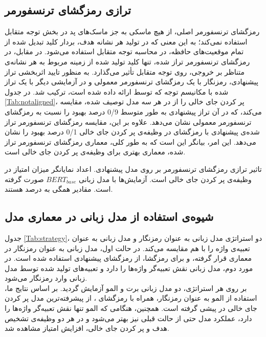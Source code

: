 \subsection{ترازی رمزگشای ترنسفورمر}
رمزگشای ترنسفورمر اصلی، از هیچ ماسکی به جز ماسک‌های پد در بخش توجه متقابل استفاده نمی‌کند؛ به این معنی که در تولید هر نشانه هدف، بردار کلید تبدیل شده از تمام موقعیت‌های حافظه، در محاسبه توجه متقابل استفاده می‌شود. در مقابل، در رمزگشای ترنسفورمر تراز شده، تنها کلید تولید شده از زمینه مربوط به هر نشانه‌ی متناظر بر خروجی، روی توجه متقابل تأثیر می‌گذارد. به منظور تایید اثربخشی تراز پیشنهادی، رمزنگار  با یک رمزگشای ترنسفورمر معمولی و در آزمایشی دیگر با یک  تراز شده با مکانیسم توجه که توسط \cite{Wang:18} ارائه داده شده است، ترکیب شد. در جدول \ref{Tab:notaligned}،  پر کردن جای خالی را از در هر سه مدل توصیف شده، مقایسه می‌کند، که در آن تراز پیشنهادی به طور متوسط 0‍/‍9 درصد بهبود را نسبت به رمزگشای ترنسفورمر معمولی نشان می‌دهد. علاوه بر این، مقایسه رمزگشای ترنسفورمر تراز شده‌ی پیشنهادی با رمزگشای \cite{Wang:18} در وظیفه‌ی پر کردن جای خالی 0‍/‍1 درصد بهبود را نشان می‌دهد. این امر، بیانگر این است که به طور کلی، معماری رمزگشای ترنسفورمر تراز شده، معماری بهتری برای وظیفه‌ی پر کردن جای خالی است.
\begin{table}[ht]
		
	\caption[تاثیر ترازی رمزگشای ترنسفورمر بر روی مدل پیشنهادی]{
		تاثیر ترازی رمزگشای ترنسفورمر بر روی مدل پیشنهادی. اعداد نمایانگر میزان امتیاز  در وظیفه‌ی پر کردن جای خالی است. آزمایش‌ها با مدل زبانی $BERT_{base}$ صورت گرفته است. مقادیر همگی به درصد هستند.
	}
\label{Tab:notaligned}
\end{table}

\subsection{شیوه‌ی استفاده از مدل زبانی در معماری مدل}
جدول \ref{Tab:strategy}، دو استراتژی مدل زبانی به عنوان رمزنگار و مدل زبانی به عنوان تعبیه‌ی واژه را با هم مقایسه می‌کند. در حالت اول، مدل زبانی به عنوان رمزنگار در معماری قرار گرفته، و برای رمزگشا، از رمزگشای پیشنهادی  استفاده شده است. در مورد دوم، مدل زبانی نقش تعبیه‌گر واژه‌ها را دارد و تعبیه‌های تولید شده توسط مدل زبانی وارد رمزنگار  می‌شود. \\
بر روی هر استراتژی، دو مدل زبانی برت و المو آزمایش گردید. بر اساس نتایج ما، استفاده از المو به عنوان رمزنگار، همراه با رمزگشای ، از پیشرفته‌ترین مدل پر کردن جای خالی در  پیشی گرفته است. همچنین، هنگامی که المو تنها نقش تعبیه‌گر واژه‌ها را دارد، عملکرد مدل حتی از حالت قبلی نیز بهتر می‌شود و در هر دو وظیفه‌ی تشخیص هدف و پر کردن جای خالی، افزایش امتیاز مشاهده شد.


